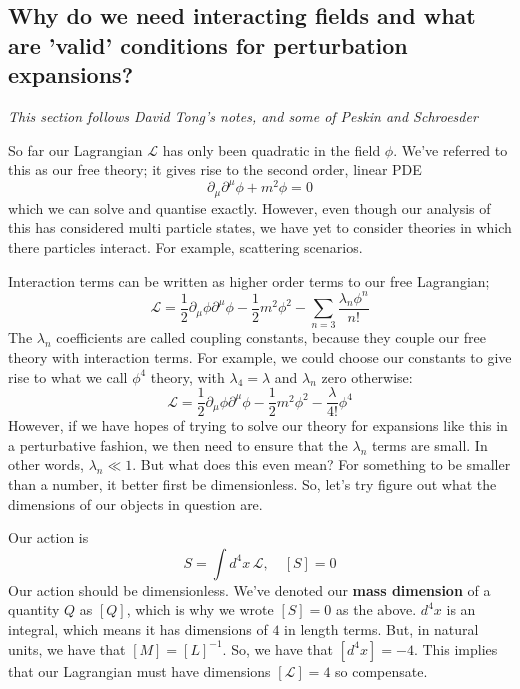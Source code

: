 \subsection{Why do we need interacting fields and what are 'valid' conditions for perturbation expansions?}
\textit{This section follows David Tong's notes, and some of Peskin and Schroesder}



\par 
So far our Lagrangian $ \mathcal{ L }$ has only been quadratic in the field
$ \phi $. We've referred to this as our free theory; it gives rise to 
the second order, linear PDE 
\[
\partial _\mu \partial ^\mu \phi + m^2 \phi = 0 
\] which we can solve and quantise exactly. 
However, even though our analysis of this has considered multi particle states, 
we have yet to consider theories in which there particles interact. 
For example, scattering scenarios. 

Interaction terms can be written as higher order terms to our 
free Lagrangian; 
\[
\mathcal{ L } = \frac{1}{2 } \partial _\mu \phi \partial ^\mu \phi  - \frac{1}{2 }m^ 2 \phi ^ 2 - \sum_{n=3 } \frac{ \lambda _n \phi ^ n }{ n !}
\] The $ \lambda _{ n }  $ coefficients are called coupling constants, 
because they couple our free theory with interaction terms. 
For example, we could choose our constants to give rise to what we call 
$ \phi ^ 4 $  theory, with $ \lambda_ 4 = \lambda  $ and  $ \lambda _ n $ zero otherwise: 
\[
\mathcal{ L } = \frac{1}{2 } \partial _\mu \phi \partial  ^ \mu \phi - \frac{1}{2 } m ^ 2 \phi ^ 2 - \frac{ \lambda }{ 4 ! } \phi ^ 4 
\] However, if we have hopes of trying to solve our 
theory for expansions like this in a perturbative fashion, 
we then need to ensure that the $ \lambda_ n $ terms are small. 
In other words, $ \lambda _ n  \ll 1 $. But what does this even mean? 
For something to be smaller than a number, it better first be dimensionless. 
So, let's try figure out what the dimensions of our objects in question are. 

Our action is 
\[
S = \int d^ 4 x \, \mathcal{ L }, \quad [ S]  =0 
\] Our action should be dimensionless. We've denoted our 
\textbf{mass dimension} of a quantity $ Q $ as $ [ Q] $,
which is why we wrote $ [ S] = 0 $ as the above. 
$ d^4 x $ is an integral, which means it has dimensions of $ 4 $
in length terms. But, in natural units, we have that 
$ [ M ] = [ L ] ^ { - 1} $. 
So, we have that  $ [ d^ 4 x ] = - 4$. 
This implies that our Lagrangian must have dimensions  $ [ \mathcal{ L } ] = 4$
so compensate. 

